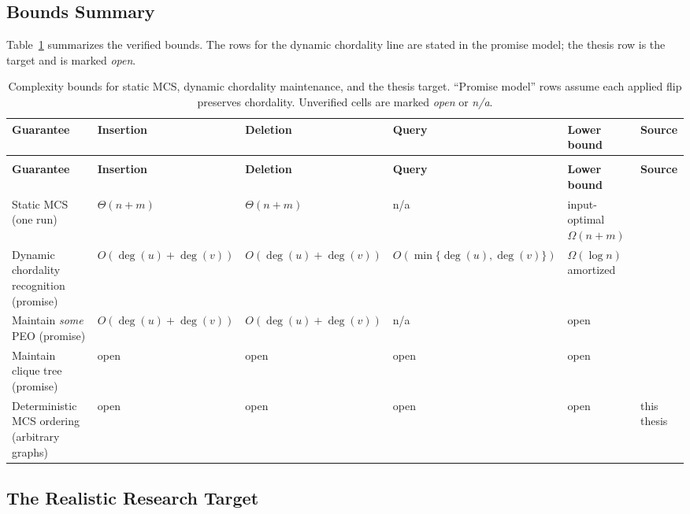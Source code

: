 \documentclass[12pt,a4paper]{article}
\begin{document}
\subsection{Bounds Summary}

Table~\ref{tab:bounds} summarizes the verified bounds. The rows for the dynamic chordality line are stated in the promise model; the thesis row is the target and is marked \textit{open}.

\begin{longtable}{|>{\raggedright\arraybackslash}p{3.6cm}|>{\centering\arraybackslash}p{1.7cm}|>{\centering\arraybackslash}p{1.7cm}|>{\centering\arraybackslash}p{1.6cm}|>{\centering\arraybackslash}p{2.1cm}|>{\raggedright\arraybackslash}p{2.6cm}|}
\caption{Complexity bounds for static MCS, dynamic chordality maintenance, and the thesis target. ``Promise model'' rows assume each applied flip preserves chordality. Unverified cells are marked \textit{open} or \textit{n/a}.}
\label{tab:bounds} \\
\hline
\textbf{Guarantee} & \textbf{Insertion} & \textbf{Deletion} & \textbf{Query} & \textbf{Lower bound} & \textbf{Source} \\
\hline
\endfirsthead
\multicolumn{6}{l}{\textbf{Table \ref{tab:bounds} (continued).}} \\
\hline
\textbf{Guarantee} & \textbf{Insertion} & \textbf{Deletion} & \textbf{Query} & \textbf{Lower bound} & \textbf{Source} \\
\hline
\endhead
\hline
\endfoot

Static MCS (one run) & $\Theta(n+m)$ & $\Theta(n+m)$ & n/a & input-optimal $\Omega(n+m)$ & \cite{tarjan1984mcs} \\
\hline
Dynamic chordality recognition (promise) & $O(\deg(u)+\deg(v))$ & $O(\deg(u)+\deg(v))$ & $O(\min\{\deg(u),\deg(v)\})$ & $\Omega(\log n)$ amortized & \cite{banerjee2018maintaining} \\
\hline
Maintain \emph{some} PEO (promise) & $O(\deg(u)+\deg(v))$ & $O(\deg(u)+\deg(v))$ & n/a & open & \cite{banerjee2018maintaining} \\
\hline
Maintain clique tree (promise) & open & open & open & open & \cite{ibarra2008dynamic} \\
\hline
Deterministic MCS ordering (arbitrary graphs) & open & open & open & open & this thesis \\
\hline
\end{longtable}

\subsection{The Realistic Research Target}
\end{document}
